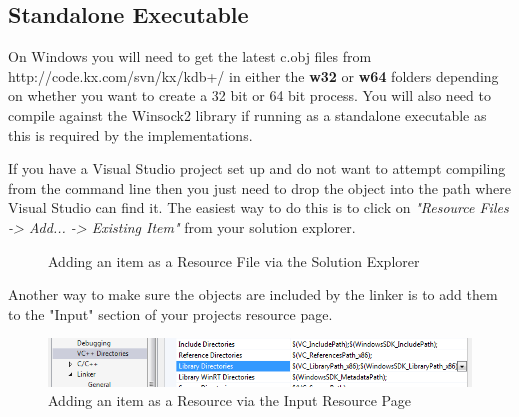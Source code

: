  \subsection{Standalone Executable}
 
 On Windows you will need to get the latest c.obj files from http://code.kx.com/svn/kx/kdb+/
 in either the \textbf{w32} or \textbf{w64} folders depending on whether you want to create a 32 bit or 64 bit
 process. You will also need to compile against the Winsock2 library if running as a standalone executable as this is required by the implementations.
 
 If you have a Visual Studio project set up and do not want to attempt compiling from the
 command line then you just need to drop the object into the path where Visual Studio can
 find it. The easiest way to do this is to click on \textit{"Resource Files -> Add... -> Existing Item"}
 from your solution explorer.
 
 \begin{figure}[h]
	 \centering
	 \caption{Adding an item as a Resource File via the Solution Explorer}
	 \label{addingvsresource}
 \end{figure}
 
 Another way to make sure the objects are included by the linker is to add them to the "Input"
 section of your projects resource page.
 
  \begin{figure}[h]
  	\centering
  	\includegraphics[scale=0.50]{figures/windows_vs2012_static_linking_dirs.png}
  	\caption{Adding an item as a Resource via the Input Resource Page}
  	\label{usingtheinputresourcepage}
  \end{figure}
 
